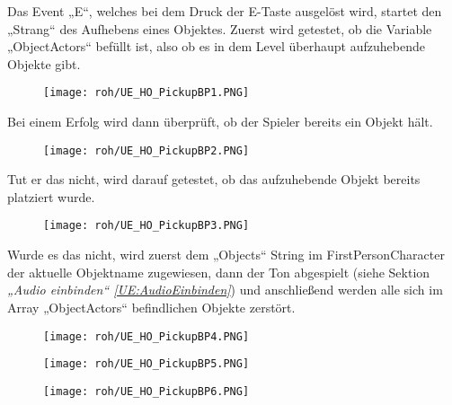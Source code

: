 Das Event „E“, welches bei dem Druck der E-Taste ausgelöst wird, startet den „Strang“ des Aufhebens eines Objektes. Zuerst wird getestet, ob die Variable „ObjectActors“ befüllt ist, also ob es in dem Level überhaupt aufzuhebende Objekte gibt.
\begin{figure}[H]
    \centering
    \texttt{[image: roh/UE\_HO\_PickupBP1.PNG]}
    \label{UE:HO_PickupBP1}
\end{figure}
Bei einem Erfolg wird dann überprüft, ob der Spieler bereits ein Objekt hält.
\begin{figure}[H]
    \centering
    \texttt{[image: roh/UE\_HO\_PickupBP2.PNG]}
    \label{UE:HO_PickupBP2}
\end{figure}
Tut er das nicht, wird darauf getestet, ob das aufzuhebende Objekt bereits platziert wurde.
\begin{figure}[H]
    \centering
    \texttt{[image: roh/UE\_HO\_PickupBP3.PNG]}
    \label{UE:HO_PickupBP3}
\end{figure}
Wurde es das nicht, wird zuerst dem „Objects“ String im FirstPersonCharacter der aktuelle Objektname zugewiesen, dann der Ton abgespielt (siehe Sektion \textit{„Audio einbinden“ \ref{UE:AudioEinbinden}}) und anschließend werden alle sich im Array „ObjectActors“ befindlichen Objekte zerstört.
\begin{figure}[H]
    \centering
    \texttt{[image: roh/UE\_HO\_PickupBP4.PNG]}
    \label{UE:HO_PickupBP4_5_6_1}
\end{figure}

\begin{figure}[H]
    \centering
    \texttt{[image: roh/UE\_HO\_PickupBP5.PNG]}
    \label{UE:HO_PickupBP4_5_6_2}
\end{figure}

\begin{figure}[H]
    \centering
    \texttt{[image: roh/UE\_HO\_PickupBP6.PNG]}
    \label{UE:HO_PickupBP4_5_6_3}
\end{figure}

